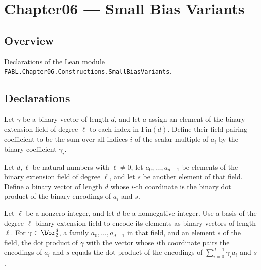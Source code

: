 \chapter{Chapter06 — Small Bias Variants}
\section{Overview}

Declarations of the Lean module \texttt{FABL.Chapter06.Constructions.SmallBiasVariants}.

\section{Declarations}

\begin{definition}
\label{FABL.fieldPairingCoefficient}
\leanok
{}
Let $\gamma$ be a binary vector of length $d$, and let $a$ assign an element of the binary
extension field of degree $\ell$ to each index in $\mathrm{Fin}(d)$. Define their field pairing
coefficient to be the sum over all indices $i$ of the scalar multiple of $a_i$ by the
binary coefficient $\gamma_i$.
\end{definition}

\begin{definition}
\label{FABL.fieldPairingGenerator}
\leanok
{}
Let $d,\ell$ be natural numbers with $\ell\ne0$, let $a_0,\ldots,a_{d-1}$ be elements of
the binary extension field of degree $\ell$, and let $s$ be another element of that
field. Define a binary vector of length $d$ whose $i$-th coordinate is the binary dot
product of the binary encodings of $a_i$ and $s$.
\end{definition}

\begin{theorem}
\leanok
{}
Let $\ell$ be a nonzero integer, and let $d$ be a nonnegative integer. Use a basis of
the degree-$\ell$ binary extension field to encode its elements as binary vectors of
length $\ell$. For $\gamma\in\bbr_2^d$, a family $a_0,\ldots,a_{d-1}$ in that field, and
an element $s$ of the field, the dot product of $\gamma$ with the vector whose $i$th
coordinate pairs the encodings of $a_i$ and $s$ equals the dot product of the encodings
of $\sum_{i=0}^{d-1}\gamma_i a_i$ and $s$.
\end{theorem}

